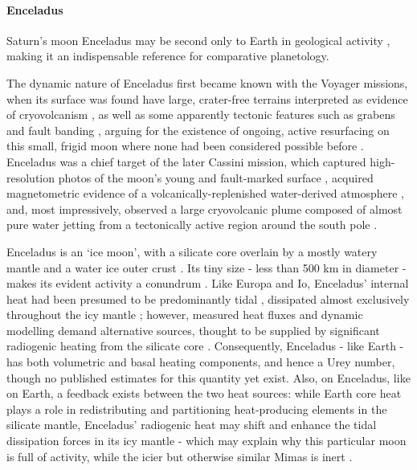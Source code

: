 \documentclass[a4paper,11pt,oneside]{book}
\begin{document}
\paragraph{Enceladus}

Saturn's moon Enceladus may be second only to Earth in geological activity \citet{Spencer2009-aq, Czechowski2017-ma}, making it an indispensable reference for comparative planetology.

The dynamic nature of Enceladus first became known with the Voyager missions, when its surface was found have large, crater-free terrains \citet{Hanel1982-dt, Smith1982-me} interpreted as evidence of cryovolcanism \cite{Kargel1996-zy}, as well as some apparently tectonic features such as grabens and fault banding \cite{Squyres1982-ip}, arguing for the existence of ongoing, active resurfacing on this small, frigid moon \cite{Squyres1983-eh} where none had been considered possible before \cite{McKinnon1987-kj}. Enceladus was a chief target of the later Cassini mission, which captured high-resolution photos of the moon's young and fault-marked surface \cite{Roatsch2008-fz}, acquired magnetometric evidence of a volcanically-replenished water-derived atmosphere \cite{Dougherty2006-ko}, and, most impressively, observed a large cryovolcanic plume \cite{Ostro2006-qd} composed of almost pure water \cite{Waite2006-pr} jetting from a tectonically active region around the south pole \cite{Porco2006-aw}.

Enceladus is an `ice moon', with a silicate core overlain by a mostly watery mantle and a water ice outer crust \cite{Iess2014-is}. Its tiny size - less than 500 km in diameter - makes its evident activity a conundrum \cite{Spencer2009-aq}. Like Europa and Io, Enceladus' internal heat had been presumed to be predominantly tidal \cite{Nimmo2014-zm}, dissipated almost exclusively throughout the icy mantle \cite{Roberts2008-ij}; however, measured heat fluxes and dynamic modelling demand alternative sources, thought to be supplied by significant radiogenic heating from the silicate core \cite{Schubert2007-xe}. Consequently, Enceladus - like Earth - has both volumetric and basal heating components, and hence a Urey number, though no published estimates for this quantity yet exist. Also, on Enceladus, like on Earth, a feedback exists between the two heat sources: while Earth core heat plays a role in redistributing and partitioning heat-producing elements in the silicate mantle, Enceladus' radiogenic heat may shift and enhance the tidal dissipation forces in its icy mantle - which may explain why this particular moon is full of activity, while the icier but otherwise similar Mimas is inert \cite{Schubert2007-xe}.
\end{document}
